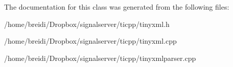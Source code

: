 The documentation for this class was generated from the following files:\begin{DoxyCompactItemize}
\item 
/home/breidi/Dropbox/signalserver/ticpp/tinyxml.h\item 
/home/breidi/Dropbox/signalserver/ticpp/tinyxml.cpp\item 
/home/breidi/Dropbox/signalserver/ticpp/tinyxmlparser.cpp\end{DoxyCompactItemize}
